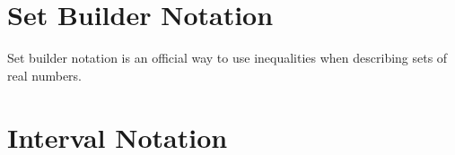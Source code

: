 \documentclass{ximera}
\begin{document}













\section{Set Builder Notation}

Set builder notation is an official way to use inequalities when describing sets of real numbers.








\section{Interval Notation}
\end{document}

